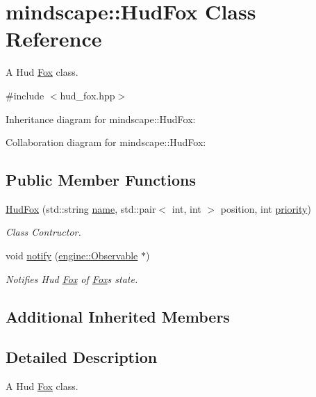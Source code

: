 \hypertarget{classmindscape_1_1_hud_fox}{}\section{mindscape\+:\+:Hud\+Fox Class Reference}
\label{classmindscape_1_1_hud_fox}


A Hud \hyperlink{classmindscape_1_1_fox}{Fox} class.  




{\ttfamily \#include $<$hud\+\_\+fox.\+hpp$>$}



Inheritance diagram for mindscape\+:\+:Hud\+Fox\+:


Collaboration diagram for mindscape\+:\+:Hud\+Fox\+:
\subsection*{Public Member Functions}
\begin{DoxyCompactItemize}
\item 
\hyperlink{classmindscape_1_1_hud_fox_affa10d22e2ffd68fb505630ff7f0bd5f}{Hud\+Fox} (std\+::string \hyperlink{classengine_1_1_game_object_a1f104f7af4f351e6d3278319762c9fe5}{name}, std\+::pair$<$ int, int $>$ position, int \hyperlink{classengine_1_1_game_object_a159ecaca30229e302793b11a75bd13c2}{priority})
\begin{DoxyCompactList}\small\item\em Class Contructor. \end{DoxyCompactList}\item 
void \hyperlink{classmindscape_1_1_hud_fox_af2076f6d6287cbab6305f09432512e93}{notify} (\hyperlink{classengine_1_1_observable}{engine\+::\+Observable} $\ast$)
\begin{DoxyCompactList}\small\item\em Notifies Hud \hyperlink{classmindscape_1_1_fox}{Fox} of \hyperlink{classmindscape_1_1_fox}{Fox}\textquotesingle{}s state. \end{DoxyCompactList}\end{DoxyCompactItemize}
\subsection*{Additional Inherited Members}


\subsection{Detailed Description}
A Hud \hyperlink{classmindscape_1_1_fox}{Fox} class. 

